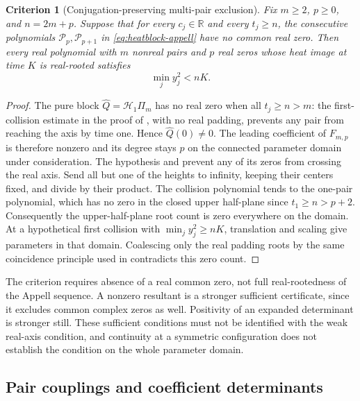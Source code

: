 \documentclass[11pt]{article}
\newtheorem{criterion}[theorem]{Criterion}
\theoremstyle{definition}
\theoremstyle{remark}
\newcommand{\R}{\mathbb R}
\begin{document}
\begin{criterion}[Conjugation-preserving multi-pair exclusion]
\label{crit:heatblock-multipair}
Fix $m\ge2$, $p\ge0$, and $n=2m+p$.  Suppose that for every
$c_j\in\R$ and every $t_j\ge n$, the consecutive polynomials
$\mathcal P_p,\mathcal P_{p+1}$ in \eqref{eq:heatblock-appell}
have no common real zero.  Then every real polynomial with $m$ nonreal
pairs and $p$ real zeros whose heat image at time $K$ is real-rooted
satisfies
\begin{equation}
 \min_j y_j^2<nK.
 \label{eq:heatblock-conditional-band}
\end{equation}
\end{criterion}

\begin{proof}
The pure block $\widehat Q=\mathcal H_1\Pi_m$ has no real zero when
all $t_j\ge n>m$: the first-collision estimate in the proof of
, with no real padding, prevents any pair
from reaching the axis by time one.  Hence $\widehat Q(0)\ne0$.
The leading coefficient of $F_{m,p}$ is therefore nonzero and its
degree stays $p$ on the connected parameter domain under consideration.
The hypothesis and  prevent any of its
zeros from crossing the real axis.  Send all but one of the heights
to infinity, keeping their centers fixed, and divide by their product.
The collision polynomial tends to the one-pair polynomial, which has
no zero in the closed upper half-plane since $t_1\ge n>p+2$.
Consequently the upper-half-plane root count is zero everywhere on
the domain.  At a hypothetical first collision with
$\min_jy_j^2\ge nK$, translation and scaling give parameters in that
domain.  Coalescing only the real padding roots by the same coincidence
principle used in  contradicts this zero count.
\end{proof}

The criterion requires absence of a real common zero, not full
real-rootedness of the Appell sequence.  A nonzero resultant is a
stronger sufficient certificate, since it excludes common complex
zeros as well.  Positivity of an expanded determinant is stronger
still.  These sufficient conditions must not be identified with the
weak real-axis condition, and continuity at a symmetric configuration
does not establish the condition on the whole parameter domain.

\subsection{Pair couplings and coefficient determinants}
\label{subsec:heatblock-pairing}
\end{document}
